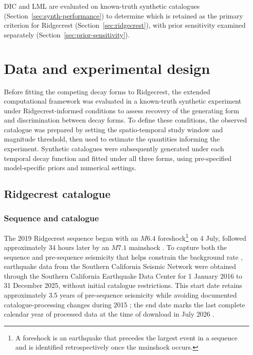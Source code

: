 \documentclass{statsmsc}
\begin{document}
DIC and LML are evaluated on known-truth synthetic catalogues (Section~\ref{sec:synth-performance}) to determine which is retained as the primary criterion for Ridgecrest (Section~\ref{sec:ridgecrest}), with prior sensitivity examined separately (Section~\ref{sec:prior-sensitivity}).

\section{Data and experimental design} \label{sec:study-design}
Before fitting the competing decay forms to Ridgecrest, the extended computational framework was evaluated in a known-truth synthetic experiment under Ridgecrest-informed conditions to assess recovery of the generating form and discrimination between decay forms. To define these conditions, the observed catalogue was prepared by setting the spatio-temporal study window and magnitude threshold, then used to estimate the quantities informing the experiment. Synthetic catalogues were subsequently generated under each temporal decay function and fitted under all three forms, using pre-specified model-specific priors and numerical settings.

\subsection{Ridgecrest catalogue} \label{sec:eda}

\subsubsection{Sequence and catalogue} 

The 2019 Ridgecrest sequence began with an $M6.4$ foreshock\footnote{A foreshock is an earthquake that precedes the largest event in a sequence and is identified retrospectively once the mainshock occurs.} on 4 July, followed approximately 34 hours later by an $M7.1$ mainshock \citep{barnhart2019ridgecrest}. To capture both the sequence and pre-sequence seismicity that helps constrain the background rate \citep{naylor2023bayesian}, earthquake data from the Southern California Seismic Network  were obtained through the Southern California Earthquake Data Center \citeyearpar[SCEDC;][]{scedc2013} for 1 January 2016 to 31 December 2025, without initial catalogue restrictions. This start date retains approximately 3.5 years of pre-sequence seismicity while avoiding documented catalogue-processing changes during 2015 ; the end date marks the last complete calendar year of processed data at the time of download in July 2026 .
\end{document}
